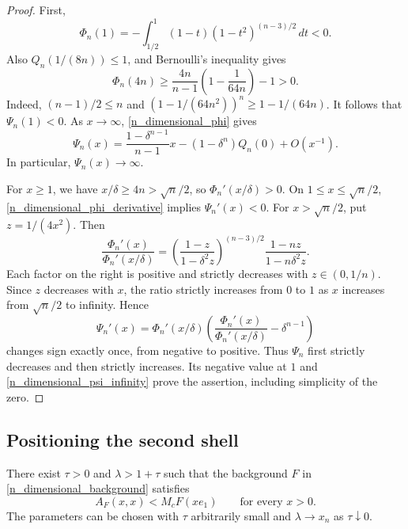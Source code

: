 \documentclass[12pt]{amsart}
\numberwithin{equation}{section}
\begin{document}
\begin{proof}
First,
\[
\Phi_n(1)=-\int_{1/2}^1(1-t)(1-t^2)^{(n-3)/2}\,dt<0.
\]
Also $Q_n(1/(8n))\leq1$, and Bernoulli's inequality gives
\[
\Phi_n(4n)
 \geq\frac{4n}{n-1}\left(1-\frac{1}{64n}\right)-1>0.
\]
Indeed, $(n-1)/2\leq n$ and
$(1-1/(64n^2))^n\geq1-1/(64n)$.
It follows that $\Psi_n(1)<0$.
As $x\to\infty$, \eqref{n_dimensional_phi} gives
\begin{equation}
\label{n_dimensional_psi_infinity}
\Psi_n(x)=\frac{1-\delta^{n-1}}{n-1}x
 -(1-\delta^n)Q_n(0)+O(x^{-1}).
\end{equation}
In particular, $\Psi_n(x)\to\infty$.

For $x\geq1$, we have $x/\delta\geq4n>\sqrt n/2$, so
$\Phi_n'(x/\delta)>0$. On $1\leq x\leq\sqrt n/2$,
\eqref{n_dimensional_phi_derivative} implies $\Psi_n'(x)<0$.
For $x>\sqrt n/2$, put $z=1/(4x^2)$. Then
\begin{equation}
\label{n_dimensional_derivative_ratio}
\frac{\Phi_n'(x)}{\Phi_n'(x/\delta)}
 =\left(\frac{1-z}{1-\delta^2z}\right)^{(n-3)/2}
       \frac{1-nz}{1-n\delta^2z}.
\end{equation}
Each factor on the right is positive and strictly decreases with
$z\in(0,1/n)$. Since $z$ decreases with $x$, the ratio strictly
increases from $0$ to $1$ as $x$ increases from $\sqrt n/2$ to
infinity. Hence
\[
\Psi_n'(x)=\Phi_n'(x/\delta)
 \left(\frac{\Phi_n'(x)}{\Phi_n'(x/\delta)}-\delta^{n-1}\right)
\]
changes sign exactly once, from negative to positive.
Thus $\Psi_n$ first strictly decreases and then strictly increases.
Its negative value at $1$ and \eqref{n_dimensional_psi_infinity}
prove the assertion, including simplicity of the zero.
\end{proof}

\subsection{Positioning the second shell}

\begin{lemma}
\label{n_dimensional_matched_shell}
There exist $\tau>0$ and $\lambda>1+\tau$ such that the background
$F$ in \eqref{n_dimensional_background} satisfies
\begin{equation}
\label{n_dimensional_strict_gap}
A_F(x,x)<M_cF(xe_1)\qquad\text{for every }x>0.
\end{equation}
The parameters can be chosen with $\tau$ arbitrarily small and
$\lambda\to x_n$ as $\tau\downarrow0$.
\end{lemma}
\end{document}
